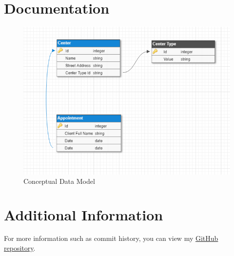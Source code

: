 \documentclass{article}
\begin{document}
	\section{Documentation}
	\begin{figure}[h!]
		\includegraphics[width=\linewidth]{data-model.png}
		\caption{Conceptual Data Model}
		\label{fig:datamodel}
	\end{figure}

	\section{Additional Information}
	For more information such as commit history, you can view my \href{https://github.com/kufii/TC-CS-02-Competition}{GitHub repository}.
\end{document}
